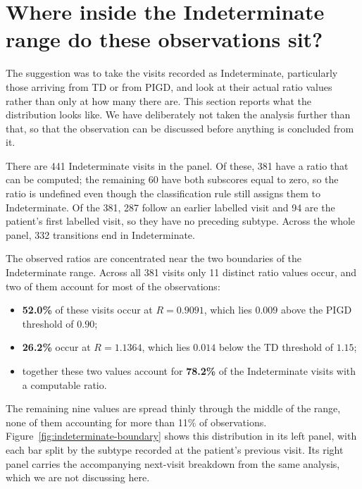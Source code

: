 \documentclass[11pt,a4paper]{article}
\begin{document}
\section{Where inside the Indeterminate range do these observations sit?}
\label{sec:indeterminate}

The suggestion was to take the visits recorded as Indeterminate, particularly
those arriving from TD or from PIGD, and look at their actual ratio values rather
than only at how many there are. This section reports what the distribution looks
like. We have deliberately not taken the analysis further than that, so that the
observation can be discussed before anything is concluded from it.

There are 441 Indeterminate visits in the panel. Of these, 381 have a ratio that
can be computed; the remaining 60 have both subscores equal to zero, so the ratio
is undefined even though the classification rule still assigns them to
Indeterminate. Of the 381, 287 follow an earlier labelled visit and 94 are the
patient's first labelled visit, so they have no preceding subtype. Across the
whole panel, 332 transitions end in Indeterminate.

The observed ratios are concentrated near the two boundaries of the Indeterminate
range. Across all 381 visits only 11 distinct ratio values occur, and two of them
account for most of the observations:

\begin{itemize}
  \item \textbf{52.0\%} of these visits occur at $R = 0.9091$, which lies
        $0.009$ above the PIGD threshold of $0.90$;
  \item \textbf{26.2\%} occur at $R = 1.1364$, which lies $0.014$ below the TD
        threshold of $1.15$;
  \item together these two values account for \textbf{78.2\%} of the
        Indeterminate visits with a computable ratio.
\end{itemize}

The remaining nine values are spread thinly through the middle of the range, none
of them accounting for more than 11\% of observations.
Figure~\ref{fig:indeterminate-boundary} shows this distribution in its left
panel, with each bar split by the subtype recorded at the patient's previous
visit. Its right panel carries the accompanying next-visit breakdown from the
same analysis, which we are not discussing here.
\end{document}
